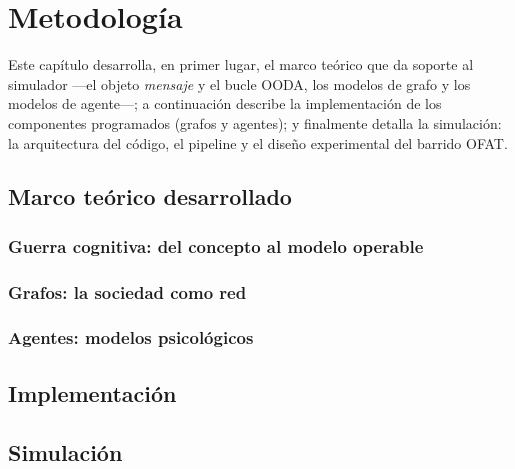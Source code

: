 \documentclass[12pt]{extarticle}
\numberwithin{equation}{section}
\begin{document}
\section{Metodolog\'ia}\label{sec:methodology}

Este cap\'itulo desarrolla, en primer lugar, el marco te\'orico que da soporte al simulador —el objeto \emph{mensaje} y el bucle OODA, los modelos de grafo y los modelos de agente—; a continuaci\'on describe la implementaci\'on de los componentes programados (grafos y agentes); y finalmente detalla la simulaci\'on: la arquitectura del c\'odigo, el pipeline y el dise\~no experimental del barrido OFAT.

\subsection{Marco te\'orico desarrollado}\label{sec:marco}

\subsubsection{Guerra cognitiva: del concepto al modelo operable}


\subsubsection{Grafos: la sociedad como red}


\subsubsection{Agentes: modelos psicol\'ogicos}


\subsection{Implementaci\'on}\label{sec:implementacion}


\subsection{Simulaci\'on}\label{sec:simulacion}



\newpage

\end{document}
